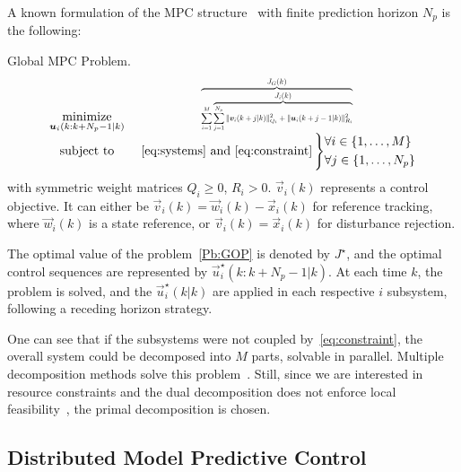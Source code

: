 \documentclass[a4paper, 10 pt, conference]{ieeeconf}  %
\begin{document}
A known formulation of the MPC structure~\cite{CamachoBordons2007,VelardeEtAl2017,VelardeEtAl2017a,SimonEtAl2012,ChanfreutEtAl2018} with finite prediction horizon $N_{p}$ is the following:
\begin{problem}{Global MPC Problem.}\label{Pb:GOP}
\begin{equation*}
\begin{matrix}
\underset{\vec{u}_i(k:k+N_{p}-1|k)}{\mathrm{minimize}}&\resizebox{0.35\textwidth}{!}{$\overbrace{\sum\limits^{M}_{i=1} \overbrace{\sum_{j=1}^{N_{p}}\|\vec{v}_i(k+j|k)\|^{2}_{Q_i}+\|\vec{u}_i(k+j-1|k)\|^{2}_{R_i}}^{\textstyle J_{i}(k)}}^{\textstyle J_{G}(k)}$}\\
\mathrm{subject~ to}&~\eqref{eq:systems}\mathrm{~and~}\eqref{eq:constraint}
\left\}\small
\begin{aligned}
  &\forall i\in\{1,\dots,M\}\\
  &\forall j\in\{1,\dots,N_{p}\}
\end{aligned}\right.

\end{matrix}
\label{eq:dmpcModLOP}
\end{equation*}
with symmetric weight matrices ${Q_{i}\geq0}$, ${R_{i}>0}$. $\vec{v}_{i}(k)$ represents a control objective. It can either be ${\vec{v}_{i}(k)=\vec{w}_{i}(k)-\vec{x}_{i}(k)}$ for reference tracking, where $\vec{w}_{i}(k)$ is a state reference, or ${\vec{v}_{i}(k)=\vec{x}_{i}(k)}$ for disturbance rejection.

The optimal value of the problem~\ref{Pb:GOP}
is denoted by $J^{\star}$, and the optimal control sequences are represented by ${\vec{u}_i^{\star}(k:k+N_{p}-1|k)}$.
At each time $k$, the problem is solved, and the $\vec{u}_i^{\star}(k|k)$ are applied in each respective $i$ subsystem, following a receding horizon strategy.
\end{problem}

One can see that if the subsystems were not coupled by~\eqref{eq:constraint},  the overall system could be decomposed into $M$ parts, solvable in parallel.
Multiple decomposition methods solve this problem~\cite{BoydEtAl2011,PaulenEtAl2016,PflaumEtAl2014,ChanfreutEtAl2018}.
Still, since we are interested in resource constraints and the dual decomposition does not enforce local feasibility~\cite{BoydEtAl2015}, the primal decomposition is chosen.

\subsection{Distributed Model Predictive Control}\label{ssec:dMPC}
\end{document}
